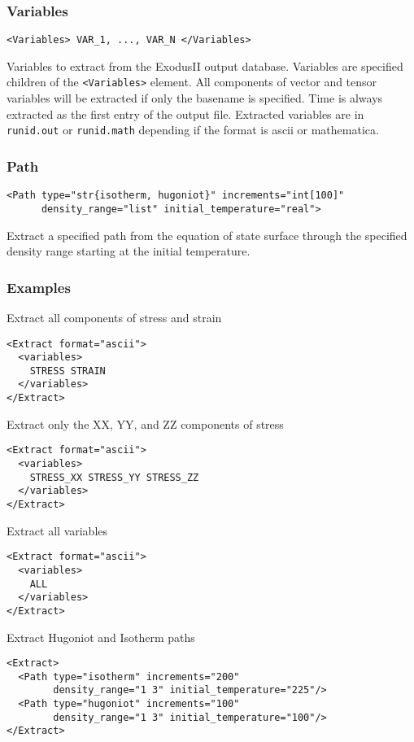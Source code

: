 \documentclass[11pt]{report}
\renewcommand{\tag}[1]{\texttt{<#1>}}
\newcommand{\supporting}[1]{\texttt{Supporting Drivers: #1}}
\begin{document}
\subsubsection{Variables}
\begin{verbatim}
<Variables> VAR_1, ..., VAR_N </Variables>
\end{verbatim}
%
Variables to extract from the ExodusII output database. Variables are specified
children of the \tag{Variables} element. All components of vector and tensor
variables will be extracted if only the basename is specified. Time is always
extracted as the first entry of the output file.  Extracted variables are in
\texttt{runid.out} or \texttt{runid.math} depending if the format is ascii or
mathematica.

\subsubsection{Path}
\begin{verbatim}
<Path type="str{isotherm, hugoniot}" increments="int[100]"
      density_range="list" initial_temperature="real">
\end{verbatim}
%
Extract a specified path from the equation of state surface through the
specified density range starting at the initial temperature.

\subsubsection{Examples}
Extract all components of stress and strain
%
\begin{verbatim}
<Extract format="ascii">
  <variables>
    STRESS STRAIN
  </variables>
</Extract>
\end{verbatim}

Extract only the XX, YY, and ZZ components of stress
%
\begin{verbatim}
<Extract format="ascii">
  <variables>
    STRESS_XX STRESS_YY STRESS_ZZ
  </variables>
</Extract>
\end{verbatim}

Extract all variables
\begin{verbatim}
<Extract format="ascii">
  <variables>
    ALL
  </variables>
</Extract>
\end{verbatim}

Extract Hugoniot and Isotherm paths
\begin{verbatim}
<Extract>
  <Path type="isotherm" increments="200"
        density_range="1 3" initial_temperature="225"/>
  <Path type="hugoniot" increments="100"
        density_range="1 3" initial_temperature="100"/>
</Extract>
\end{verbatim}
\end{document}
